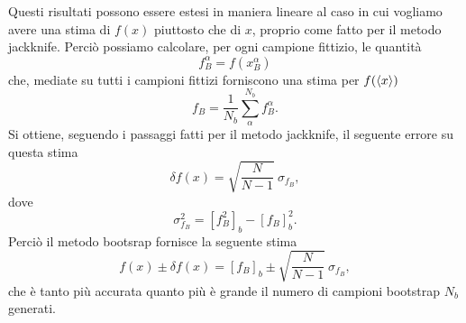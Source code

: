 \documentclass[LaM]{sapthesis}
\begin{document}
	Questi risultati possono essere estesi in maniera lineare al caso in cui vogliamo avere una stima di $f(x)$ piuttosto che di $x$, proprio come fatto per il metodo jackknife. Perciò possiamo calcolare, per ogni campione fittizio, le quantità
	\begin{equation}
		f^\alpha_B=f(x^\alpha_B)
	\end{equation}
	che, mediate su tutti i campioni fittizi forniscono una stima per $f(\braket{x})$
	\begin{equation}
	f_B=\frac{1}{N_b}\sum_{\alpha}^{N_b}f^\alpha_B.
	\end{equation}
	Si ottiene, seguendo i passaggi fatti per il metodo jackknife, il seguente errore su questa stima
	\begin{equation}
		\delta f(x)=\sqrt{\frac{N}{N-1}}\ \sigma_{f_B},
	\end{equation}
	dove
	\begin{equation}
	\sigma^2_{f_B}=\left[f_B^2\right]_b-\left[f_B\right]_b^2.
	\end{equation}
	Perciò il metodo bootsrap fornisce la seguente stima
	\begin{equation}
	f(x) \pm \delta f(x)=[f_B]_b \pm \sqrt{\frac{N}{N-1}} \ \sigma_{f_B},
	\end{equation}	
	che è tanto più accurata quanto più è grande il numero di campioni bootstrap $N_b$ generati.
	
\end{document}
